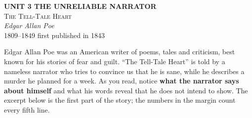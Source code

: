 \documentclass[11pt,a4paper]{article}
\begin{document}
\begin{center}
{\sffamily\small\color{anthology}\textbf{UNIT 3 \quad THE UNRELIABLE NARRATOR}}\\[0.9em]
{\fontsize{26}{30}\selectfont\textsc{The Tell-Tale Heart}}\\[0.5em]
{\large\itshape Edgar Allan Poe}\\[0.1em]
{\sffamily\small 1809--1849 \textperiodcentered{} first published in 1843}
\end{center}

\vspace{0.4em}
\begin{tcolorbox}[colback=anthology!6, colframe=anthology, boxrule=0.5pt, left=8pt, right=8pt, top=5pt, bottom=5pt,
  arc=0pt, title={\sffamily\bfseries Before you read}, fonttitle=\sffamily\small, coltitle=white, colbacktitle=anthology]
\sffamily\small
Edgar Allan Poe was an American writer of poems, tales and criticism, best known for his stories of fear and
guilt. ``The Tell-Tale Heart'' is told by a nameless narrator who tries to convince us that he is sane, while he
describes a murder he planned for a week. As you read, notice \textbf{what the narrator says about himself} and
what his words reveal that he does not intend to show. The excerpt below is the first part of the story; the
numbers in the margin count every fifth line.
\end{tcolorbox}
\end{document}
